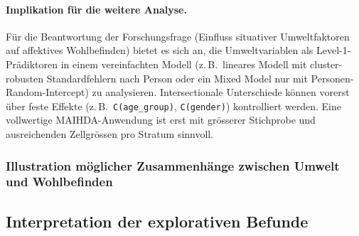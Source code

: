 \paragraph{Implikation für die weitere Analyse.}
Für die Beantwortung der Forschungsfrage (Einfluss situativer Umweltfaktoren auf affektives Wohlbefinden) bietet es sich an, die Umweltvariablen als Level-1-Prädiktoren in einem vereinfachten Modell (z.\,B.\ lineares Modell mit cluster-robusten Standardfehlern nach Person oder ein Mixed Model nur mit Personen-Random-Intercept) zu analysieren. Intersectionale Unterschiede können vorerst über feste Effekte (z.\,B.\ \texttt{C(age\_group)}, \texttt{C(gender)}) kontrolliert werden. Eine vollwertige MAIHDA-Anwendung ist erst mit grösserer Stichprobe und ausreichenden Zellgrössen pro Stratum sinnvoll.

\subsubsection{Illustration möglicher Zusammenhänge zwischen Umwelt und Wohlbefinden}

\subsection{Interpretation der explorativen Befunde}

